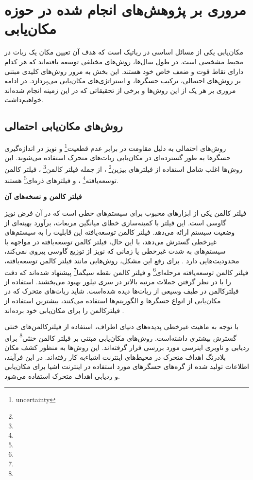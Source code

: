 \section{مروری بر پژوهش‌های انجام شده در حوزه مکان‌یابی} 

مکان‌یابی یکی از مسائل اساسی در رباتیک است که هدف آن تعیین مکان یک ربات در محیط مشخصی است. در طول سال‌ها، روش‌های مختلفی توسعه یافته‌اند که هر کدام دارای نقاط قوت و ضعف خاص خود هستند. این بخش به مرور روش‌های کلیدی مبتنی بر روش‌های احتمالی، ترکیب حسگرها، و استراتژی‌های مکان‌یابی می‌پردازد. در ادامه مروری بر هر یک از این روش‌ها و برخی از تحقیقاتی که در این زمینه انجام شده‌اند خواهیم‌داشت.


\subsection{روش‌های مکان‌یابی احتمالی}

روش‌های احتمالی به دلیل مقاومت در برابر عدم قطعیت\footnote{uncertainty}
 و نویز در اندازه‌گیری حسگرها به طور گسترده‌ای در مکان‌یابی ربات‌های متحرک استفاده می‌شوند. این روش‌ها اغلب شامل استفاده از فیلترهای بیزین\footnote{}
 ، از جمله فیلتر کالمن\footnote{}
، فیلتر کالمن توسعه‌یافته\footnote{}
، و فیلترهای ذره‌ای\footnote{}
 هستند.


\textbf {فیلتر کالمن و نسخه‌های آن}

فیلتر کالمن یکی از ابزارهای محبوب برای سیستم‌های خطی است که در آن فرض نویز گاوسی است. این فیلتر با کمینه‌سازی خطای میانگین مربعات، برآورد بهینه‌ای از وضعیت سیستم ارائه می‌دهد. فیلتر کالمن توسعه‌یافته این قابلیت را به سیستم‌های غیرخطی گسترش می‌دهد، با این حال،  فیلتر کالمن توسعه‌یافته در مواجهه با سیستم‌های به شدت غیرخطی یا زمانی که نویز از توزیع گاوسی پیروی نمی‌کند، محدودیت‌هایی دارد
\cite{burgard1997active}
. برای رفع این مشکل، روش‌هایی مانند فیلتر کالمن توسعه‌یافته، فیلتر کالمن توسعه‌یافته مرحله‌ای\footnote{}
 و فیلتر کالمن نقطه سیگما\footnote{}
  پیشنهاد شده‌اند که دقت را با در نظر گرفتن جملات مرتبه بالاتر در سری تیلور بهبود می‌بخشند.
استفاده از فیلترکالمن در طیف وسیعی از ربات‌ها دیده‌ شده‌است. شاید ربات‌های متحرک که در مکان‌یابی از انواع حسگر‌ها و الگوریتم‌ها استفاده می‌کنند، بیشترین‌ استفاد‌ه از فیلترکالمن را برای مکان‌یابی خود برده‌اند
\cite{liu2021cost, lin2018topological, negenborn2003robot}. 

با توجه به ماهیت غیرخطی پدیده‌های دنیای اطراف، استفاده از فیلترکالمن‌های خنثی گسترش بیشتری داشته‌است. 
\cite{zhan2007iterated, xian2016square} 
 روش‌های مکان‌یابی مبتنی بر فیلتر کالمن خنثی\footnote{}
 برای ردیابی و ناوبری اینرسی مورد بررسی قرار گرفته‌اند. این روش‌ها به منظور کشف مکان بلادرنگ اهداف متحرک در محیط‌های اینترنت اشیاءبه کار رفته‌اند. در این فرآیند، اطلاعات تولید شده از گره‌های حسگرهای مورد استفاده در اینترنت اشیا برای مکان‌یابی و ردیابی اهداف متحرک استفاده می‌شود.
  
